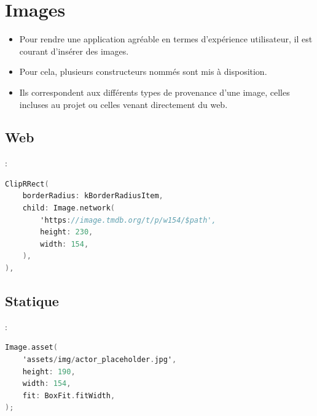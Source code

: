 \documentclass[10pt]{beamer}
\begin{document}
\section{Images}
\begin{frame}[fragile]{\secname}
    \begin{itemize}
        \item Pour rendre une application agréable en termes d’expérience utilisateur, il est courant d’insérer des images.
        \item Pour cela, plusieurs constructeurs nommés sont mis à disposition.
        \item Ils correspondent aux différents types de provenance d’une image, celles incluses au projet ou celles venant directement du web.
    \end{itemize}
\end{frame}

\subsection{Web}
\begin{frame}[fragile]{\secname : \subsecname}
    \begin{lstlisting}[language=C]
ClipRRect(
    borderRadius: kBorderRadiusItem,
    child: Image.network(
        'https://image.tmdb.org/t/p/w154/$path',
        height: 230,
        width: 154,
    ),
),
\end{lstlisting}
\end{frame}
\subsection{Statique}
\begin{frame}[fragile]{\secname : \subsecname}
    \begin{lstlisting}[language=C]
Image.asset(
    'assets/img/actor_placeholder.jpg',
    height: 190,
    width: 154,
    fit: BoxFit.fitWidth,
);
\end{lstlisting}
\end{frame}
\end{document}

